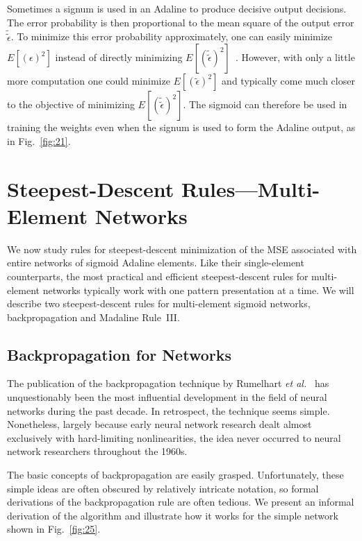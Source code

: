 \documentclass[10pt,twocolumn]{article}
\begin{document}
Sometimes a signum is used in an Adaline to produce decisive output decisions. The
error probability is then proportional to the mean square of the output error
$\tilde{\tilde{\epsilon}}$. To minimize this error probability approximately, one
can easily minimize $E[(\epsilon)^2]$ instead of directly minimizing
$E[(\tilde{\tilde{\epsilon}})^2]$~\cite{ieeewescon}. However, with only a little
more computation one could minimize $E[(\tilde{\epsilon})^2]$ and typically come
much closer to the objective of minimizing $E[(\tilde{\tilde{\epsilon}})^2]$. The
sigmoid can therefore be used in training the weights even when the signum is used
to form the Adaline output, as in Fig.~\ref{fig:21}.

\section{Steepest-Descent Rules---Multi-Element Networks}
We now study rules for steepest-descent minimization of the MSE associated with
entire networks of sigmoid Adaline elements. Like their single-element
counterparts, the most practical and efficient steepest-descent rules for
multi-element networks typically work with one pattern presentation at a time. We
will describe two steepest-descent rules for multi-element sigmoid networks,
backpropagation and Madaline Rule~III.

\subsection{Backpropagation for Networks}
The publication of the backpropagation technique by Rumelhart \textit{et
al.}~\cite{rhw86} has unquestionably been the most influential development in the
field of neural networks during the past decade. In retrospect, the technique
seems simple. Nonetheless, largely because early neural network research dealt
almost exclusively with hard-limiting nonlinearities, the idea never occurred to
neural network researchers throughout the 1960s.

The basic concepts of backpropagation are easily grasped. Unfortunately, these
simple ideas are often obscured by relatively intricate notation, so formal
derivations of the backpropagation rule are often tedious. We present an informal
derivation of the algorithm and illustrate how it works for the simple network
shown in Fig.~\ref{fig:25}.
\end{document}
